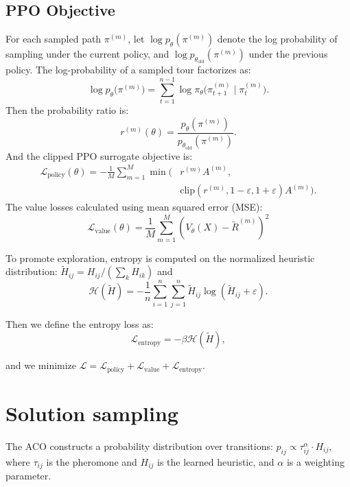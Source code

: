 \documentclass[a4paper,conference]{IEEEtran}
\newcommand{\calH}{\mathcal{H}}
\newcommand{\eps}{\varepsilon}
\begin{document}
\subsection{PPO Objective}
For each sampled path $\pi^{(m)}$, let $\log p_{\theta}(\pi^{(m)})$ denote the log probability of sampling under the current policy, and $\log p_{\theta_{\text{old}}}(\pi^{(m)})$ under the previous policy.
The log-probability of a sampled tour factorizes as:
\begin{equation}
\log p_\theta\!\big(\pi^{(m)}\big)
= \sum_{t=1}^{n-1} \log \pi_\theta\!\big(\pi^{(m)}_{t+1}\mid \pi^{(m)}_{t}\big).
\end{equation}
Then the probability ratio is:
\begin{equation}
r^{(m)}(\theta) = \frac{p_{\theta}(\pi^{(m)})}{p_{\theta_{\text{old}}}(\pi^{(m)})}.
\end{equation}
And the clipped PPO surrogate objective is:
\begin{equation}
\begin{aligned}
\mathcal{L}_{\text{policy}}(\theta) = -\frac{1}{M}\sum_{m=1}^M \min\big(&r^{(m)}A^{(m)}, \\
&\text{clip}(r^{(m)},1-\eps,1+\eps)A^{(m)}\big).
\end{aligned}
\end{equation}
The value losses calculated using mean squared error (MSE):
\begin{equation}
\mathcal{L}_{\text{value}}(\theta)
= \frac{1}{M}\sum_{m=1}^{M}\!\left(V_\theta(X) - \tilde R^{(m)}\right)^2
\end{equation}

To promote exploration, entropy is computed on the normalized heuristic distribution: $\tilde{H}_{ij} = H_{ij} / (\sum_k H_{ik})$ and
\begin{equation}
\calH(\tilde{H}) = -\frac{1}n \sum_{i=1}^n\sum_{j=1}^n \tilde{H}_{ij}\log(\tilde{H}_{ij}+\eps).
\end{equation}

Then we define the entropy loss as:
\begin{equation}
\mathcal{L}_{\text{entropy}} = -\beta\calH(\tilde{H}),
\end{equation}

and we minimize $\mathcal{L}=\mathcal{L}_{\text{policy}}+\mathcal{L}_{\text{value}}+\mathcal{L}_{\text{entropy}}$.

\section{Solution sampling}
The ACO constructs a probability distribution over transitions:
$
p_{ij} \propto \tau_{ij}^\alpha \cdot H_{ij},
$
where $\tau_{ij}$ is the pheromone and $H_{ij}$ is the learned heuristic, and $\alpha$ is a weighting parameter.
\end{document}
